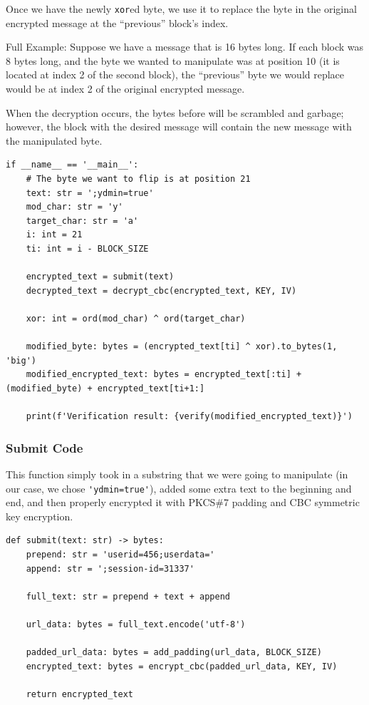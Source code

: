\documentclass[11pt]{article}
\begin{document}
Once we have the newly \verb|xor|ed byte, we use it to replace the byte in the original encrypted message at the ``previous'' block's index.

Full Example: Suppose we have a message that is 16 bytes long. If each block was 8 bytes long, and the byte we wanted to manipulate was at position 10 (it is located at index 2 of the second block), the ``previous'' byte we would replace would be at index 2 of the original encrypted message.

When the decryption occurs, the bytes before will be scrambled and garbage; however, the block with the desired message will contain the new message with the manipulated byte.

\begin{lstlisting}
if __name__ == '__main__':
    # The byte we want to flip is at position 21
    text: str = ';ydmin=true'
    mod_char: str = 'y'
    target_char: str = 'a'
    i: int = 21
    ti: int = i - BLOCK_SIZE

    encrypted_text = submit(text)
    decrypted_text = decrypt_cbc(encrypted_text, KEY, IV)

    xor: int = ord(mod_char) ^ ord(target_char)

    modified_byte: bytes = (encrypted_text[ti] ^ xor).to_bytes(1, 'big')
    modified_encrypted_text: bytes = encrypted_text[:ti] + (modified_byte) + encrypted_text[ti+1:]

    print(f'Verification result: {verify(modified_encrypted_text)}')
\end{lstlisting}

\subsubsection*{Submit Code}

This function simply took in a substring that we were going to manipulate (in our case, we chose \verb|'ydmin=true'|), added some extra text to the beginning and end, and then properly encrypted it with PKCS\#7 padding and CBC symmetric key encryption.

\begin{lstlisting}
def submit(text: str) -> bytes:
    prepend: str = 'userid=456;userdata='
    append: str = ';session-id=31337'

    full_text: str = prepend + text + append 
    
    url_data: bytes = full_text.encode('utf-8')

    padded_url_data: bytes = add_padding(url_data, BLOCK_SIZE)
    encrypted_text: bytes = encrypt_cbc(padded_url_data, KEY, IV)

    return encrypted_text
\end{lstlisting}
\end{document}
